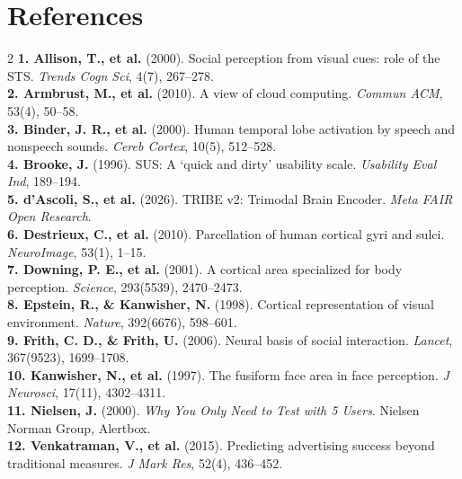 \documentclass[10pt,a4paper]{article}
\begin{document}
\section*{\textsf{References}}
\begin{multicols}{2}
\scriptsize
\noindent
\textbf{1. Allison, T., et al.} (2000). Social perception from visual cues: role of the STS. \textit{Trends Cogn Sci}, 4(7), 267--278.\\
\textbf{2. Armbrust, M., et al.} (2010). A view of cloud computing. \textit{Commun ACM}, 53(4), 50--58.\\
\textbf{3. Binder, J. R., et al.} (2000). Human temporal lobe activation by speech and nonspeech sounds. \textit{Cereb Cortex}, 10(5), 512--528.\\
\textbf{4. Brooke, J.} (1996). SUS: A `quick and dirty' usability scale. \textit{Usability Eval Ind}, 189--194.\\
\textbf{5. d'Ascoli, S., et al.} (2026). TRIBE v2: Trimodal Brain Encoder. \textit{Meta FAIR Open Research}.\\
\textbf{6. Destrieux, C., et al.} (2010). Parcellation of human cortical gyri and sulci. \textit{NeuroImage}, 53(1), 1--15.\\
\textbf{7. Downing, P. E., et al.} (2001). A cortical area specialized for body perception. \textit{Science}, 293(5539), 2470--2473.\\
\textbf{8. Epstein, R., \& Kanwisher, N.} (1998). Cortical representation of visual environment. \textit{Nature}, 392(6676), 598--601.\\
\textbf{9. Frith, C. D., \& Frith, U.} (2006). Neural basis of social interaction. \textit{Lancet}, 367(9523), 1699--1708.\\
\textbf{10. Kanwisher, N., et al.} (1997). The fusiform face area in face perception. \textit{J Neurosci}, 17(11), 4302--4311.\\
\textbf{11. Nielsen, J.} (2000). \textit{Why You Only Need to Test with 5 Users}. Nielsen Norman Group, Alertbox.\\
\textbf{12. Venkatraman, V., et al.} (2015). Predicting advertising success beyond traditional measures. \textit{J Mark Res}, 52(4), 436--452.
\end{multicols}
\end{document}
